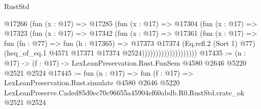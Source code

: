 \begin{lexlean}{RustStd}
\begin{coremodule}
                            @17266
                              (fun (x : @17) =>
                              @17285
                                (fun (x : @17) =>
                                @17304
                                  (fun (x : @17) =>
                                  @17323
                                    (fun (x : @17) =>
                                    @17342
                                      (fun (x : @17) =>
                                      @17361
                                        (fun (x : @17) =>
                                        fun (fn : @77) =>
                                        fun (h : @17365) =>
                                        @17373
                                          @17374
                                          (Eq.refl.{2} (Sort 1) @77)
                                          (heq_of_eq.{1}
                                            @4571
                                            @17371
                                            @17374
                                            @2524))))))))))))))))))))
@17435 := (n : @17) -> (f : @17) -> LexLeanPreservation.Rust.FunSem @4580 @2646 @5220 @2521 @2524
@17445 := fun (n : @17) =>
  fun (f : @17) =>
  LexLeanPreservation.Rust.simulate
    @4580
    @2646
    @5220
    LexLeanPreserve.Caded85d0ec70c96655a45904ef60abdb.R0.RustStd.crate_ok
    @2521
    @2524
\end{coremodule}
\end{lexlean}
